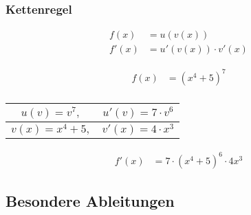 \documentclass[11pt, openany]{book}
\begin{document}
\subsubsection{Kettenregel}
\noindent\begin{minipage}{\boxwidth}
\begin{tcolorbox}
    \begin{align*}
        f(x) &= u(v(x)) \\
        f'(x) &= u'(v(x))\cdot v'(x)
    \end{align*}
\end{tcolorbox}
\end{minipage}
\hfill
\begin{minipage}{\examplewidth}
\begin{align*}
f(x) &= (x^4 + 5)^7 \\
\end{align*}
\begin{tabular}{|c|c|}
\hline
$u(v) = v^7,$ & $u'(v) = 7\cdot v^6$ \\
\hline
$v(x) = x^4 + 5,$ & $v'(x) = 4\cdot x^3$ \\
\hline
\end{tabular}
\begin{align*}
f'(x) &= 7\cdot (x^4 + 5)^6 \cdot 4x^3
\end{align*}
\end{minipage}

\subsection{Besondere Ableitungen}
\end{document}
